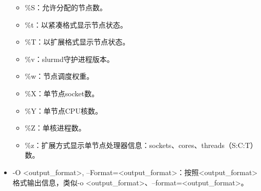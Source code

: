 \begin{itemize}
\begin{itemize}
   	\item \%S：允许分配的节点数。
   	\item \%t：以紧凑格式显示节点状态。
   	\item \%T：以扩展格式显示节点状态。
   	\item \%v：slurmd守护进程版本。
   	\item \%w：节点调度权重。
   	\item \%X：单节点socket数。
   	\item \%Y：单节点CPU核数。
   	\item \%Z：单核进程数。
   	\item \%z：扩展方式显示单节点处理器信息：sockets、cores、threads（S:C:T）数。
\end{itemize}
	\item -O <output\_format>, --Format=<output\_format>：按照<output\_format>格式输出信息，类似-o <output\_format>、--format=<output\_format>。


\end{itemize}
